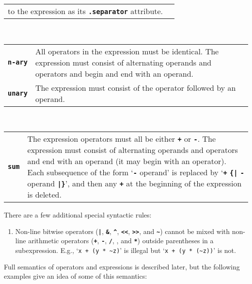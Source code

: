 \documentclass[12pt]{article}
\newcommand{\TT}[1]{{\tt \bfseries #1}}
\newcommand{\ttkey}[1]{{\tt \bfseries #1}}
\begin{document}
\begin{center}
\begin{tabular}{p{1in}p{5.0in}}
      to the expression as its \TT{.separator} attribute.
\end{tabular}
\\[0.5ex]
\begin{tabular}{p{1in}p{5.0in}}
\ttkey{n-ary}
    & All operators in the expression must be identical.
      The expression must consist of alternating operands
      and operators and begin and end with an operand.
\\[1ex]
\ttkey{unary}
    & The expression must consist of
      the operator followed by an operand.
\end{tabular}
\\[0.5ex]
\begin{tabular}{p{1in}p{5.0in}}
\ttkey{sum}
    & The expression operators must all be either \TT{+} or \TT{-}.
      The expression must consist of alternating operands
      and operators and end with an operand (it may begin with
      an operator).
      Each subsequence of the form `\TT{-} operand' is
      replaced by `\TT{+} \TT{\{|} \TT{-} operand \TT{|\}}', and then
      any \TT{+} at the beginning of the expression is deleted.
\end{tabular}
\end{center}

There are a few additional special syntactic rules:
\begin{enumerate}
\item Non-line bitwise operators (\TT{|}, \TT{\&}, \TT{\textasciicircum},
\TT{<{}<}, \TT{>{}>}, and \TT{\textasciitilde}) cannot be mixed
with non-line arithmetic operators
(\TT{+}, \TT{-}, \TT{/}, \TT{*}, and \TT{**})
outside parentheses in a subexpression.
E.g., `{\tt x + (y * \textasciitilde z)}'
is illegal but `{\tt x + (y * (\textasciitilde z))}' is not.
\end{enumerate}


Full semantics of operators and expressions is described later,
but the following examples give an idea of some of this semantics:
\end{document}
